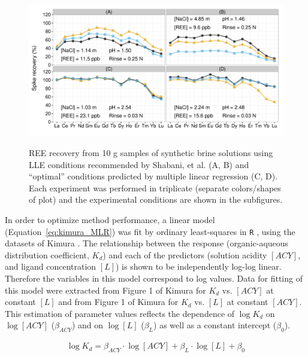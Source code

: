 \begin{figure}[htbp]
\begin{center}
\includegraphics[width=\textwidth]{Ch4_figures/LLE-reproduction-recoveries.pdf}
\caption{REE recovery from 10 g samples of synthetic brine solutions using LLE conditions recommended by Shabani, et al.\citep{Shabani_AC_1990} (A, B)
and ``optimal'' conditions predicted by multiple linear regression (C, D).
Each experiment was performed in triplicate (separate colors/shapes of plot) and the experimental conditions are shown in the subfigures.}\label{fig:reproduction}
\label{default}
\end{center}
\end{figure}

In order to optimize method performance, a linear model (Equation~\ref{eq:kimura_MLR}) was fit by ordinary least-squares in \texttt{R} \citep{R},
using the datasets of Kimura \citep{Kimura_BCSJ_1960, Kimura_BCSJ_1961}.
The relationship between the response (organic-aqueous distribution coefficient, $K_d$) and each of the predictors (solution acidity $[ACY]$, and ligand concentration $[L]$) is shown to be independently log-log linear.
Therefore the variables in this model correspond to log values. Data for fitting of this model were extracted from Figure 1 of Kimura \citep{Kimura_BCSJ_1960} for $K_d$ vs. $[ACY]$ at constant $[L]$ and from Figure 1 of Kimura \citep{Kimura_BCSJ_1961} for $K_d$ vs. $[L]$ at constant $[ACY]$. This estimation of parameter values reflects the dependence of $\log K_d$ on $\log[ACY]$ ($\beta_{ACY}$) and on $\log[L]$ ($\beta_L$) as well as a constant intercept ($\beta_0$).

\begin{align}\label{eq:kimura_MLR}
\log K_d = \beta_{ACY} \cdot \log[ACY] + \beta_L \cdot \log[L] + \beta_0
\end{align}

